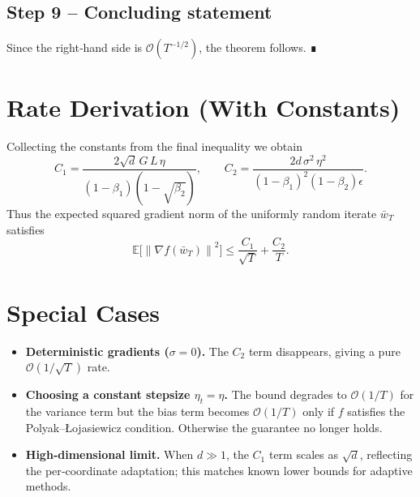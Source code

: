 \documentclass[11pt]{article}
\newcommand{\E}{\mathbb{E}}
\newcommand{\norm}[1]{\left\lVert #1\right\rVert}
\begin{document}
\subsection*{Step 9 – Concluding statement}
Since the right‑hand side is $\mathcal{O}(T^{-1/2})$, the theorem follows. ∎

\section*{Rate Derivation (With Constants)}
Collecting the constants from the final inequality we obtain
\[
C_{1}= \frac{2\sqrt{d}\,G\,L\,\eta}{(1-\beta_{1})(1-\sqrt{\beta_{2}})},
\qquad
C_{2}= \frac{2d\,\sigma^{2}\,\eta^{2}}{(1-\beta_{1})^{2}(1-\beta_{2})\epsilon}.
\]
Thus the expected squared gradient norm of the uniformly random iterate $\bar w_{T}$ satisfies
\[
\E\!\big[\norm{\nabla f(\bar w_{T})}^{2}\big]
\le \frac{C_{1}}{\sqrt{T}}+\frac{C_{2}}{T}.
\]

\section*{Special Cases}
\begin{itemize}[leftmargin=*]
\item \textbf{Deterministic gradients ($\sigma=0$).} The $C_{2}$ term disappears, giving a pure $\mathcal{O}(1/\sqrt{T})$ rate.
\item \textbf{Choosing a constant stepsize $\eta_{t}=\eta$.} The bound degrades to $\mathcal{O}(1/T)$ for the variance term but the bias term becomes $\mathcal{O}(1/T)$ only if $f$ satisfies the Polyak–Łojasiewicz condition. Otherwise the guarantee no longer holds.
\item \textbf{High‑dimensional limit.} When $d\gg1$, the $C_{1}$ term scales as $\sqrt{d}$, reflecting the per‑coordinate adaptation; this matches known lower bounds for adaptive methods.
\end{itemize}
\end{document}
